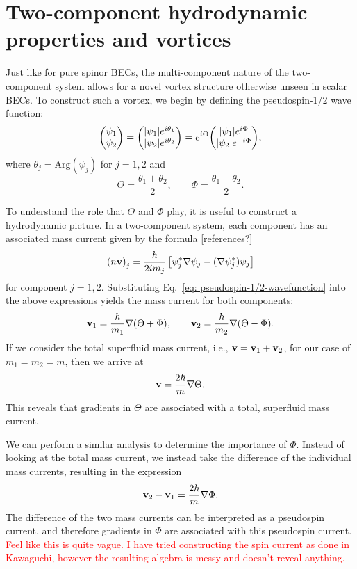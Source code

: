 \section{Two-component hydrodynamic properties and vortices}
Just like for pure spinor BECs, the multi-component nature of the two-component
system allows for a novel vortex structure otherwise unseen in scalar BECs.
To construct such a vortex, we begin by defining the pseudospin-1/2
wave function:
\begin{equation}
    \mqty(\psi_1 \\ \psi_2) =
    \mqty(|\psi_1|e^{i\theta_1} \\ |\psi_2|e^{i\theta_2}) =
    e^{i\Theta}\mqty(|\psi_1|e^{i\Phi} \\ |\psi_2|e^{-i\Phi}),
    \label{eq: pseudospin-1/2-wavefunction}
\end{equation}
where \( \theta_j=\mathrm{Arg}(\psi_j) \) for \( j=1,2 \) and
\begin{equation}\label{eq: Theta-Phi}
    \Theta = \frac{\theta_1 + \theta_2}{2}, \qquad
    \Phi = \frac{\theta_1 - \theta_2}{2}.
\end{equation}

To understand the role that \(\Theta \) and \(\Phi \) play, it is useful to
construct a hydrodynamic picture.
In a two-component system, each component has an associated mass current given
by the formula [references?]
\begin{equation}
    {(n\vb{v})}_j=\frac{\hbar}{2im_j}
    \left[\psi_j^*\nabla\psi_j-(\nabla\psi_j^*)\psi_j\right]
    \label{eq: two-comp-mass-current}
\end{equation}
for component \(j=1,2\).
Substituting Eq.~\eqref{eq: pseudospin-1/2-wavefunction} into the above
expressions yields the mass current for both components:
\begin{equation}
    \vb{v}_1 = \frac{\hbar}{m_1}\nabla(\Theta + \Phi), \qquad
    \vb{v}_2 = \frac{\hbar}{m_2}\nabla(\Theta - \Phi).
\end{equation}
If we consider the total superfluid mass current, i.e.,
\(\vb{v} = \vb{v}_1 + \vb{v}_2\), for our case of \(m_1=m_2=m\), then we arrive
at
\begin{equation}
    \vb{v} = \frac{2\hbar}{m}\nabla\Theta.
    \label{eq: two-comp-velocity}
\end{equation}
This reveals that gradients in \(\Theta \) are associated with a total,
superfluid mass current.

We can perform a similar analysis to determine the importance of \(\Phi \).
Instead of looking at the total mass current, we instead take the difference
of the individual mass currents, resulting in the expression
\begin{equation}
    \vb{v}_2 - \vb{v}_1 = \frac{2\hbar}{m}\nabla\Phi.
\end{equation}
The difference of the two mass currents can be interpreted as a pseudospin
current, and therefore gradients in \(\Phi \) are associated with this
pseudospin current.
\textcolor{red}{Feel like this is quite vague. I have tried constructing the
    spin current as done in Kawaguchi, however the resulting algebra is messy
    and doesn't reveal anything.}

